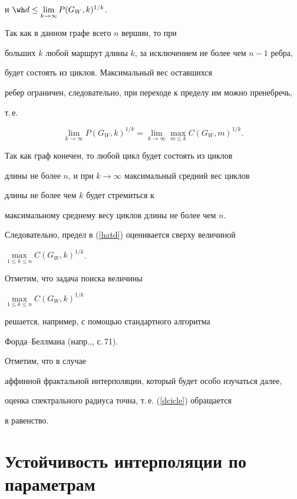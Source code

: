 \begin{pf}
и $ \wh d \le \lim\limits_{k\to \infty} P(G_W,k)^{1/k}$.


Так как в данном графе всего $n$ вершин, то при


больших $k$ любой маршрут длины $k$, за исключением не более чем $n-1$ ребра,


будет состоять из циклов. Максимальный вес оставшихся


ребер ограничен, следовательно, при переходе к пределу им можно пренебречь,


т.\,е.


$$


\lim_{k \to \infty } P(G_W,k)^{1/k} =


\lim_{k \to \infty } \max_{m \le k } C(G_W,m)^{1/k}.


$$


Так как граф конечен, то любой цикл будет состоять из циклов


длины не более $n$, и при $k \to \infty $ максимальный средний вес циклов


длины не более чем $k$ будет стремиться к


максимальному среднему весу циклов длины не более чем $n$.


Следовательно, предел в (\ref{hatd}) оценивается сверху величиной


$\max\limits_{1\le k \le n } C(G_W,k)^{1/k}$.


\end{pf}





Отметим, что задача поиска величины


$\max\limits_{1\le k \le n } C(G_W,k)^{1/k} $


решается, например, с помощью стандартного алгоритма


Форда--Беллмана (напр.,\cite{Asanov}, с.\,71).


Отметим, что в случае


аффинной фрактальной интерполяции, который будет особо изучаться далее,


оценка спектрального радиуса точна, т.\,е. (\ref{dcicle}) обращается


в равенство.





\section{Устойчивость интерполяции по параметрам}





